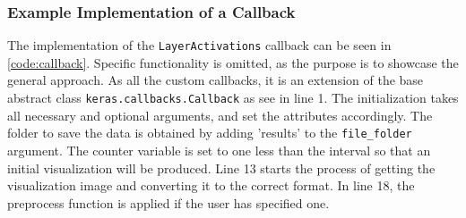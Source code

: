 
\subsubsection{Example Implementation of a Callback}

The implementation of the \texttt{LayerActivations} callback can be seen in \autoref{code:callback}. Specific functionality is omitted, as the purpose is to showcase the general approach. As all the custom callbacks, it is an extension of the base abstract class \texttt{keras.callbacks.Callback} as see in line 1. The initialization takes all necessary and optional arguments, and set the attributes accordingly. The folder to save the data is obtained by adding 'results' to the \texttt{file\_folder} argument. The counter variable is set to one less than the interval so that an initial visualization will be produced. Line 13 starts the process of getting the visualization image and converting it to the correct format. In line 18, the preprocess function is applied if the user has specified one. \\

